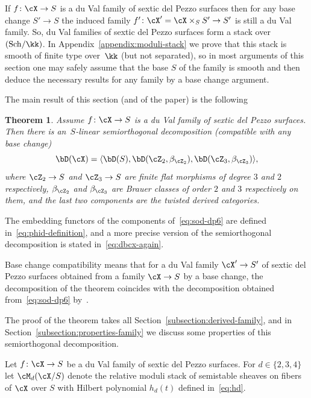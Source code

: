 \documentclass[11pt]{amsart}
\theoremstyle{plain}
\newtheorem{theorem}{Theorem}[section]
\theoremstyle{definition}
\theoremstyle{remark}
\begin{document}
If $f \colon \cX \to S$ is a du Val family of sextic del Pezzo surfaces then for any base change $S' \to S$ the induced family $f' \colon \cX' = \cX \times_S S' \to S'$ is still a du Val family.
So, du Val families of sextic del Pezzo surfaces form a stack over $(\mathrm{Sch}/\kk)$.
In Appendix~\ref{appendix:moduli-stack} we prove that this stack is smooth of finite type over~$\kk$ (but not separated), so in most arguments of this section one may safely assume 
that the base $S$ of the family is smooth and then deduce the necessary results for any family by a base change argument.

The main result of this section (and of the paper) is the following

\begin{theorem}
\label{theorem:sod-dp6}
Assume $f \colon \cX \to S$ is a du Val family of sextic del Pezzo surfaces.
Then there is an~$S$-linear semiorthogonal decomposition \textup{(}compatible with any base change\textup{)}
\begin{equation}
\label{eq:sod-dp6}
\bD(\cX) = \langle \bD(S), \bD(\cZ_2,\beta_{\cZ_2}), \bD(\cZ_3,\beta_{\cZ_3}) \rangle,
\end{equation}
where $\cZ_2 \to S$ and $\cZ_3 \to S$ are finite flat morphisms of degree $3$ and $2$ respectively, 
$\beta_{\cZ_2}$ and $\beta_{\cZ_3}$ are Brauer classes of order $2$ and $3$ respectively on them,
and the last two components are the twisted derived categories.
\end{theorem}

The embedding functors of the components of~\eqref{eq:sod-dp6} are defined in~\eqref{eq:phid-definition},
and a more precise version of the semiorthogonal decomposition is stated in~\eqref{eq:dbcx-again}.

Base change compatibility means that for a du Val family $\cX' \to S'$ of sextic del Pezzo surfaces obtained from a family $\cX \to S$ by a base change, 
the decomposition of the theorem coincides with the decomposition obtained from~\eqref{eq:sod-dp6} by~\cite[Theorem~5.6]{kuznetsov2011base}.

The proof of the theorem takes all Section~\ref{subsection:derived-family}, and in Section~\ref{subsection:properties-family} we discuss some properties of this semiorthogonal decomposition.


Let $f \colon \cX \to S$ be a du Val family of sextic del Pezzo surfaces.
For $d \in \{2,3,4\}$ let $\cM_d(\cX/S)$ denote the relative moduli stack of semistable sheaves on fibers of $\cX$ over $S$ with Hilbert polynomial $h_d(t)$ defined in~\eqref{eq:hd}.
\end{document}

